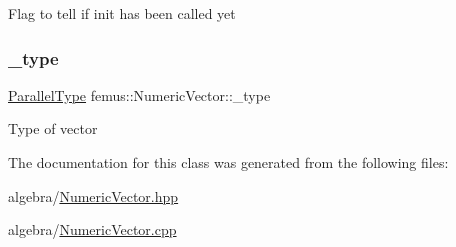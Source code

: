 Flag to tell if init has been called yet \mbox{\label{classfemus_1_1_numeric_vector_a40eebd0755df82e691bea575694f1100}} 
\subsubsection{\texorpdfstring{\+\_\+type}{\_type}}
{\footnotesize\ttfamily \mbox{\hyperlink{_paralleltype_enum_8hpp_a55f694af2ca20b6481914237cf7e567c}{Parallel\+Type}} femus\+::\+Numeric\+Vector\+::\+\_\+type\hspace{0.3cm}{\ttfamily [protected]}}

Type of vector 

The documentation for this class was generated from the following files\+:\begin{DoxyCompactItemize}
\item 
algebra/\mbox{\hyperlink{_numeric_vector_8hpp}{Numeric\+Vector.\+hpp}}\item 
algebra/\mbox{\hyperlink{_numeric_vector_8cpp}{Numeric\+Vector.\+cpp}}\end{DoxyCompactItemize}
